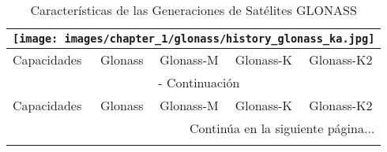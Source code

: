 \begin{center}
    \begin{longtable}{|p{3cm}|c|c|c|c|}
        \caption{Características de las Generaciones de Satélites GLONASS} \label{tab:glonass_satellites} \\
        \hline
        \multicolumn{5}{|c|}{
            \texttt{[image: images/chapter\_1/glonass/history\_glonass\_ka.jpg]}
        } \\
        \hline
        \cellcolor{lightblue}Capacidades & \cellcolor{lightblue}Glonass & \cellcolor{lightblue}Glonass-M & \cellcolor{lightblue}Glonass-K & \cellcolor{lightblue}Glonass-K2 \\
        \hline
        \endfirsthead
    
        \multicolumn{5}{c}{{\tablename\ \thetable{} - Continuación}} \\
        \hline
        \cellcolor{lightblue}Capacidades & \cellcolor{lightblue}Glonass & \cellcolor{lightblue}Glonass-M & \cellcolor{lightblue}Glonass-K & \cellcolor{lightblue}Glonass-K2 \\
        \hline
        \endhead
    
        \hline
        \multicolumn{5}{r}{{\fontsize{9}{11}\selectfont Continúa en la siguiente página...}} \\
        \endfoot
    
        \hline
        \endlastfoot
    

\end{longtable}
\end{center}
